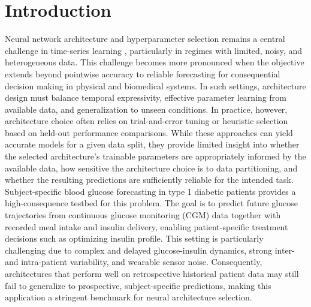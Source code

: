 \documentclass[preprint,12pt]{elsarticle}
\begin{document}


\section{Introduction}
\label{sec:introduction}

Neural network architecture and hyperparameter selection remains a central challenge in time-series learning \cite{ZHANG, LUCAS, HU}, particularly in regimes with limited, noisy, and heterogeneous data. This challenge becomes more pronounced when the objective extends beyond pointwise accuracy to reliable forecasting for consequential decision making in physical and biomedical systems. In such settings, architecture design must balance temporal expressivity, effective parameter learning from available data, and generalization to unseen conditions.
In practice, however, architecture choice often relies on trial-and-error tuning or heuristic selection based on held-out performance comparisons. While these approaches can yield accurate models for a given data split, they provide limited insight into whether the selected architecture's trainable parameters are appropriately informed by the available data, how sensitive the architecture choice is to data partitioning, and whether the resulting predictions are sufficiently reliable for the intended task.
Subject-specific blood glucose forecasting in type 1 diabetic patients provides a high-consequence testbed for this problem. The goal is to predict future glucose trajectories from continuous glucose monitoring (CGM) data together with recorded meal intake and insulin delivery, enabling patient-specific treatment decisions such as optimizing insulin profile. This setting is particularly challenging due to complex and delayed glucose-insulin dynamics, strong inter- and intra-patient variability, and wearable sensor noise. Consequently, architectures that perform well on retrospective historical patient data may still fail to generalize to prospective, subject-specific predictions, making this application a stringent benchmark for neural architecture selection.
\end{document}
